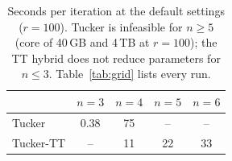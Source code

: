 \begin{table}[t]
  \centering
  \small
  \begin{tabular}{lcccc}
    \toprule
     & $n=3$ & $n=4$ & $n=5$ & $n=6$ \\
    \midrule
    Tucker & 0.38 & 75 & -- & -- \\
    Tucker-TT & -- & 11 & 22 & 33 \\
    \bottomrule
  \end{tabular}
  \caption{Seconds per iteration at the default settings ($r=100$). Tucker is infeasible for $n\geq5$ (core of 40\,GB and 4\,TB at $r=100$); the TT hybrid does not reduce parameters for $n\leq3$. Table~\ref{tab:grid} lists every run.}
  \label{tab:iter-time}
\end{table}
